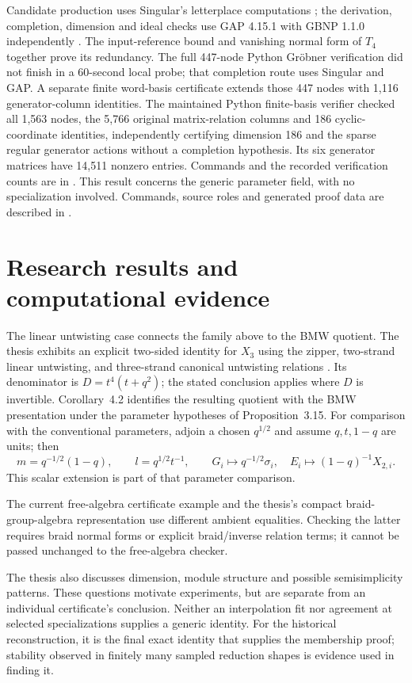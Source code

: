 \documentclass[11pt]{article}
\begin{document}
Candidate production uses Singular's letterplace computations
\cite{singular}; the derivation, completion, dimension and ideal checks use
GAP 4.15.1 with GBNP 1.1.0 independently \cite{gbnp}. The input-reference
bound and vanishing normal form of $T_4$ together prove its redundancy.
The full 447-node Python Gr\"obner verification did not finish in a
60-second local probe; that completion route uses Singular and GAP.
A separate finite word-basis certificate extends those 447 nodes with
1,116 generator-column identities. The maintained Python finite-basis verifier
checked all 1,563 nodes, the 5,766 original matrix-relation columns and
186 cyclic-coordinate identities, independently certifying dimension 186
and the sparse regular generator actions without a completion hypothesis.
Its six generator matrices have 14,511 nonzero entries. Commands and the
recorded verification counts are in . This result concerns the generic parameter field, with no
specialization involved. Commands, source roles and generated proof data are
described in .

\section{Research results and computational evidence}
The linear untwisting case connects the family above to the BMW quotient.
The thesis exhibits an explicit two-sided identity for $X_3$ using the zipper,
two-strand linear untwisting, and three-strand canonical untwisting relations
\cite[Theorem~4.1 and Appendix~A]{thesis}. Its denominator is
$D=t^4(t+q^2)$; the stated conclusion applies where $D$ is invertible.
Corollary~4.2 identifies the resulting quotient with the BMW presentation under
the parameter hypotheses of Proposition~3.15. For comparison with the
conventional parameters, adjoin a chosen $q^{1/2}$ and assume $q,t,1-q$ are
units; then
\[
 m=q^{-1/2}(1-q),\qquad l=q^{1/2}t^{-1},\qquad
 G_i\longmapsto q^{-1/2}\sigma_i,\quad
 E_i\longmapsto(1-q)^{-1}X_{2,i}.
\]
This scalar extension is part of that parameter comparison.

The current free-algebra certificate example and the thesis's compact
braid-group-algebra representation use different ambient equalities. Checking
the latter requires braid normal forms or explicit braid/inverse relation
terms; it cannot be passed unchanged to the free-algebra checker.

The thesis also discusses dimension, module structure and possible
semisimplicity patterns. These questions motivate experiments, but are separate
from an individual certificate's conclusion. Neither an interpolation fit nor
agreement at selected specializations supplies a generic identity. For the
historical reconstruction, it is the final exact identity that supplies the
membership proof; stability observed in finitely many sampled reduction shapes
is evidence used in finding it.
\end{document}
